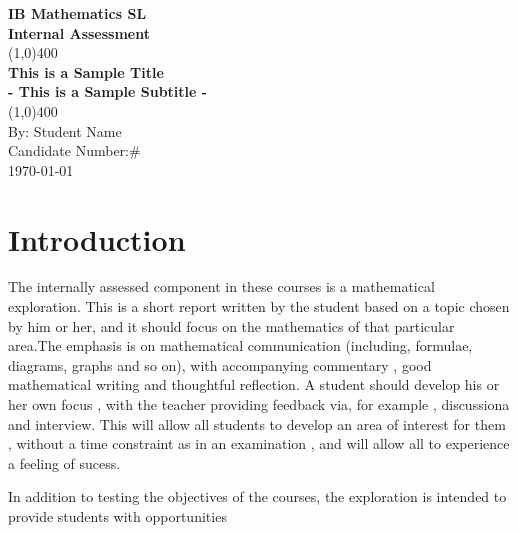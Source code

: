 \documentclass[11pt]{article}
\begin{document}
\begin{titlepage}
    \begin{center}
        \vspace*{1cm}
        \Large{\textbf{IB Mathematics SL}}\\
        \Large{\textbf{Internal Assessment}}\\
        \vfill
        \line(1,0){400}\\[1mm]
        \huge{\textbf{This is a Sample Title}}\\[3mm]
        \Large{\textbf{- This is a Sample Subtitle -}}\\[1mm]
        \line(1,0){400}\\
        \vfill
        By: Student Name\\
        Candidate Number:\#\\
        \today\\
    \end{center}
\end{titlepage}

\tableofcontents
\thispagestyle{empty}
\clearpage

\setcounter{page}{1}

\section{Introduction}
The internally assessed component in these courses is a mathematical exploration. This is a short report written by the student based on a topic chosen by him or her, and it should focus on the mathematics of that particular area.The emphasis is on mathematical communication (including, formulae, diagrams, graphs and so on), with accompanying commentary , good mathematical writing and thoughtful reflection. A student should develop his or her  own focus , with the teacher providing feedback via, for example , discussiona and interview. This will allow all students to develop an area of interest for them , without a time constraint as in an examination , and will allow all to experience a feeling of sucess.


In addition to testing the objectives of the courses, the exploration is intended to provide students with opportunities 
\end{document}
